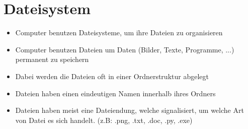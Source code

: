 \section{Dateisystem}
\begin{frame}
    \slidehead
    \begin{itemize}
        \item Computer benutzen Dateisysteme, um ihre Dateien zu organisieren
        \item Computer benutzen Dateien um Daten (Bilder, Texte, Programme, ...) permanent zu speichern
        \item Dabei werden die Dateien oft in einer Ordnerstruktur abgelegt
        \item Dateien haben einen eindeutigen Namen innerhalb ihres Ordners
        \item Dateien haben meist eine Dateiendung, welche signalisiert, um welche Art von Datei es sich handelt. (z.B: .png, .txt, .doc, .py, .exe)
    \end{itemize}
\end{frame}

